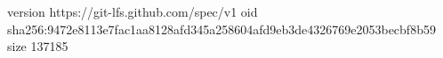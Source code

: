 version https://git-lfs.github.com/spec/v1
oid sha256:9472e8113e7fac1aa8128afd345a258604afd9eb3de4326769e2053becbf8b59
size 137185
